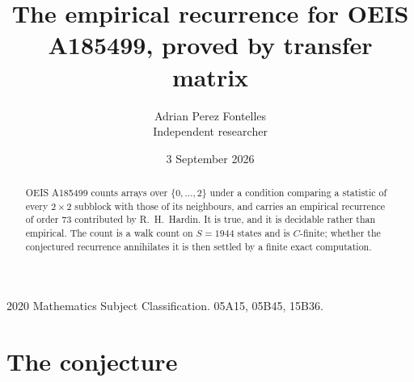 \documentclass[11pt,a4paper]{article}
\title{The empirical recurrence for OEIS A185499, proved by transfer matrix}
\author{Adrian Perez Fontelles\\ \small Independent researcher}
\date{3 September 2026}
\theoremstyle{plain}
\theoremstyle{definition}
\begin{document}
\maketitle

\begin{abstract}
OEIS A185499 counts arrays over $\{0,\dots,2\}$ under a condition comparing a statistic of
every $2\times2$ subblock with those of its neighbours, and carries an empirical recurrence
of order $73$ contributed by R.~H.~Hardin. It is true, and it is decidable rather than
empirical. The count is a walk count on $S=1944$ states and is $C$-finite; whether the
conjectured recurrence annihilates it is then settled by a finite exact computation.
\end{abstract}

\noindent\small 2020 Mathematics Subject Classification. 05A15, 05B45, 15B36.\normalsize

\section{The conjecture}
\end{document}
